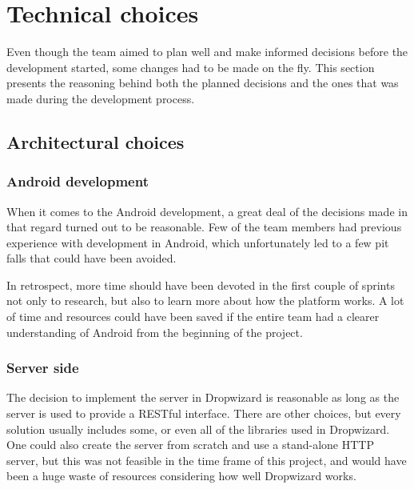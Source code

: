 \section{Technical choices}
Even though the team aimed to plan well and make informed decisions before the development started, some changes had to be made on the fly. This section presents the reasoning behind both the planned decisions and the ones that was made during the development process.

\subsection{Architectural choices}
\subsubsection{Android development}
When it comes to the Android development, a great deal of the decisions made in that regard turned out to be reasonable. Few of the team members had previous experience with development in Android, which unfortunately led to a few pit falls that could have been avoided.

In retrospect, more time should have been devoted in the first couple of sprints not only to research, but also to learn more about how the platform works. A lot of time and resources could have been saved if the entire team had a clearer understanding of Android from the beginning of the project.

\subsubsection{Server side}

The decision to implement the server in Dropwizard is reasonable as long as the server is used to provide a RESTful interface. There are other choices, but every solution usually includes some, or even all of the libraries used in Dropwizard. One could also create the server from scratch and use a stand-alone HTTP server, but this was not feasible in the time frame of this project, and would have been a huge waste of resources considering how well Dropwizard works.

